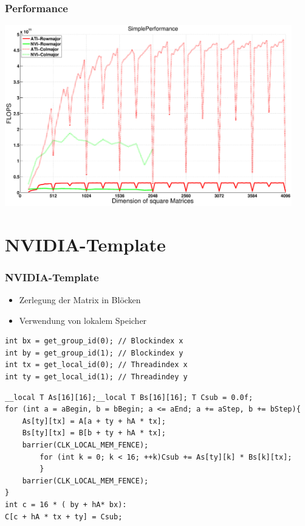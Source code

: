 \documentclass{beamer}
\begin{document}
\begin{frame}
	\frametitle{Performance}
\begin{center}
\includegraphics[width=12.5cm]{SimplePerformance}
\end{center}


	
\end{frame}


\section{NVIDIA-Template}
\begin{frame}[fragile]
\frametitle{NVIDIA-Template}

\begin{itemize}
\item
Zerlegung der Matrix in Bl\"ocken
\item
Verwendung von lokalem Speicher 
\end{itemize}

\begin{lstlisting}[style=customc,caption=NVIDIA-Snippet]
int bx = get_group_id(0); // Blockindex x
int by = get_group_id(1); // Blockindex y
int tx = get_local_id(0); // Threadindex x
int ty = get_local_id(1); // Threadindey y
\end{lstlisting}



\end{frame}


\begin{frame}[fragile]
\begin{lstlisting}[style=customc,caption=NVIDIA-Snippet(2)]
__local T As[16][16];__local T Bs[16][16]; T Csub = 0.0f;
for (int a = aBegin, b = bBegin; a <= aEnd; a += aStep, b += bStep){ 
	As[ty][tx] = A[a + ty + hA * tx];
	Bs[ty][tx] = B[b + ty + hA * tx];
	barrier(CLK_LOCAL_MEM_FENCE);
		for (int k = 0; k < 16; ++k)Csub += As[ty][k] * Bs[k][tx];
		}
    barrier(CLK_LOCAL_MEM_FENCE);
}
int c = 16 * ( by + hA* bx):
C[c + hA * tx + ty] = Csub;
\end{lstlisting}


\end{frame}
\end{document}
